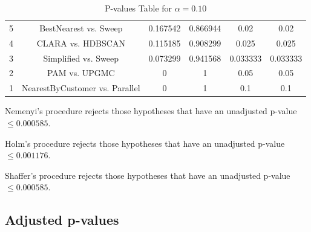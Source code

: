 \documentclass[a4paper,10pt]{article}
\begin{document}
\begin{landscape}
\begin{table}[!htp]
\begin{tabular}{cccccc}
5&BestNearest vs. Sweep&0.167542&0.866944&0.02&0.02\\
4&CLARA vs. HDBSCAN&0.115185&0.908299&0.025&0.025\\
3&Simplified vs. Sweep&0.073299&0.941568&0.033333&0.033333\\
2&PAM vs. UPGMC&0&1&0.05&0.05\\
1&NearestByCustomer vs. Parallel&0&1&0.1&0.1\\
\hline
\end{tabular}
\caption{P-values Table for $\alpha=0.10$}
\end{table}Nemenyi's procedure rejects those hypotheses that have an unadjusted p-value $\le0.000585$.

Holm's procedure rejects those hypotheses that have an unadjusted p-value $\le0.001176$.

Shaffer's procedure rejects those hypotheses that have an unadjusted p-value $\le0.000585$.

\pagebreak

\subsection{Adjusted p-values}


\end{landscape}
\end{document}
